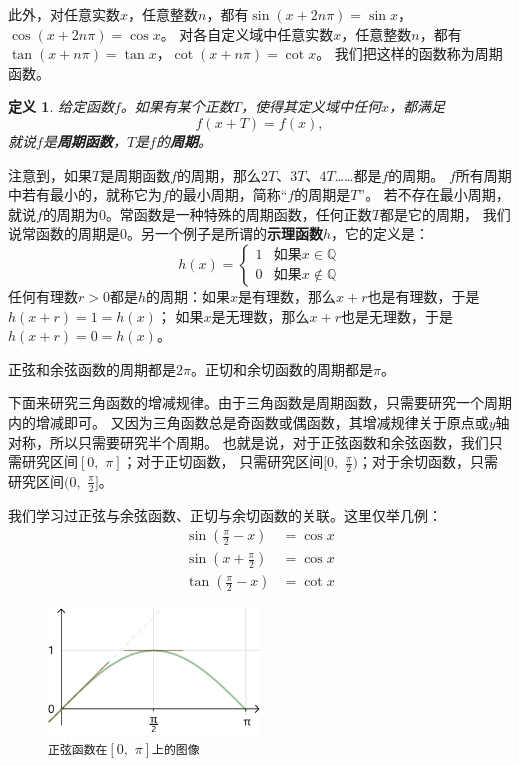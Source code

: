 \documentclass[12pt,UTF8]{ctexbook}
\newtheorem{df}{定义}[section]
\begin{document}
此外，对任意实数$x$，任意整数$n$，都有$\sin(x+2n\pi) = \sin{x}$，$\cos(x+2n\pi) = \cos{x}$。
对各自定义域中任意实数$x$，任意整数$n$，都有$\tan(x+n\pi) = \tan{x}$，$\cot(x+n\pi) = \cot{x}$。
我们把这样的函数称为周期函数。
\begin{df}
    给定函数$f$。如果有某个正数$T$，使得其定义域中任何$x$，都满足
    $$ f(x + T) = f(x),$$
    就说$f$是\textbf{周期函数}，$T$是$f$的\textbf{周期}。
\end{df}
注意到，如果$T$是周期函数$f$的周期，那么$2T$、$3T$、$4T$……都是$f$的周期。
$f$所有周期中若有最小的，就称它为$f$的最小周期，简称“$f$的周期是$T$”。
若不存在最小周期，就说$f$的周期为$0$。常函数是一种特殊的周期函数，任何正数$T$都是它的周期，
我们说常函数的周期是$0$。另一个例子是所谓的\textbf{示理函数}$h$，它的定义是：
$$
h(x) = \left\{
        \begin{array}{cc}
        1 & \mbox{如果}x\in\mathbb{Q} \\
        0 & \mbox{如果}x\notin\mathbb{Q} 
        \end{array}
    \right.
$$
任何有理数$r>0$都是$h$的周期：如果$x$是有理数，那么$x+r$也是有理数，于是$h(x+r) = 1 = h(x)$；
如果$x$是无理数，那么$x+r$也是无理数，于是$h(x+r) = 0 = h(x)$。

正弦和余弦函数的周期都是$2\pi$。正切和余切函数的周期都是$\pi$。

下面来研究三角函数的增减规律。由于三角函数是周期函数，只需要研究一个周期内的增减即可。
又因为三角函数总是奇函数或偶函数，其增减规律关于原点或$y$轴对称，所以只需要研究半个周期。
也就是说，对于正弦函数和余弦函数，我们只需研究区间$[0, \,\,\pi]$；对于正切函数，
只需研究区间$[0, \,\,\frac{\pi}{2})$；对于余切函数，只需研究区间$(0, \,\,\frac{\pi}{2}]$。

我们学习过正弦与余弦函数、正切与余切函数的关联。这里仅举几例：
\begin{align*}
    \sin{\left(\frac{\pi}{2} - x\right)} &= \cos{x}  \\
    \sin{\left(x + \frac{\pi}{2}\right)} &= \cos{x}  \\
    \tan{\left(\frac{\pi}{2} - x\right)} &= \cot{x}      
\end{align*}

\begin{figure} %
    \vspace{-35pt}
    \flushright
    \includegraphics[width=0.5\textwidth]{tu/三角函数2.png}
    \caption*{\texttt{正弦函数在}$[0,\,\,\pi]$\texttt{上的图像}}
\end{figure}
\end{document}
